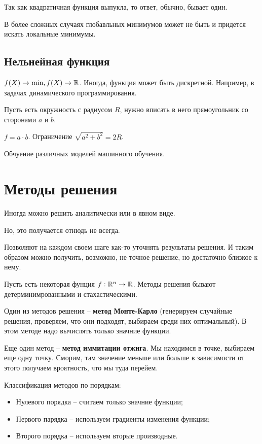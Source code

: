 Так как квадратичная функция выпукла, то ответ, обычно, бывает один.

В более сложных случаях глобавльных минимумов может не быть и придется искать локальные минимумы.

\subsection{Нельнейная функция}
$f(X) \to \min, f(X) \to \mathbb{R}$.
Иногда, функция может быть дискретной.
Например, в задачах динамического программирования.

\begin{example}
    Пусть есть окружность с радиусом $R$, нужно вписать в него прямоугольник со сторонами $a$ и $b$.

    $f = a \cdot b$.
    Ограничение $\sqrt{a^2 + b^2} = 2R$.
\end{example}

\begin{example}
    Обчуение различных моделей машинного обучения.
\end{example}


\section{Методы решения}
Иногда можно решить аналитически или в явном виде.

Но, это получается отнюдь не всегда.

\begin{definition}
    Позволяют на каждом своем шаге как-то уточнять результаты решения.
    И таким образом можно получить, возможно, не точное решение, но достаточно близкое к нему.
\end{definition}

Пусть есть некоторая фунция $f: \mathbb{R}^n \to \mathbb{R}$.
Методы решения бывают детерминимрованными и стахастическими.

Один из методов решения -- \textbf{метод Монте-Карло} (генерируем случайные решения, проверяем, что они подходят, выбираем среди них оптимальный).
В этом методе надо вычислять только значние функции.

Еще один метод -- \textbf{метод иммитации отжига}.
Мы находимся в точке, выбираем еще одну точку.
Сморим, там значение меньше или больше в зависимости от этого получаем вроятность, что мы туда перейем.

Классификация методов по порядкам:
\begin{itemize}
    \item Нулевого порядка -- считаем только значние функции;
    \item Первого парядка -- используем градиенты изменения функции;
    \item Второго порядка -- используем вторые производные.
\end{itemize}

